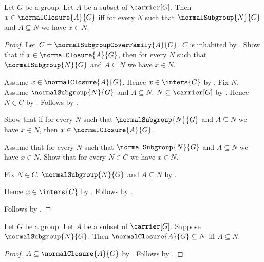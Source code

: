 \begin{theorem}\label{normal_closure_iff}
    Let $G$ be a group.
    Let $A$ be a subset of $\carrier[G]$.
    Then $x\in\normalClosure{A}{G}$ iff for every $N$ such that
        $\normalSubgroup{N}{G}$ and $A\subseteq N$ we have $x\in N$.
\end{theorem}
\begin{proof}
    Let $C=\normalSubgroupCoverFamily{A}{G}$.
    $C$ is inhabited by
        .
    Show that if $x\in\normalClosure{A}{G}$, then for every $N$ such that
        $\normalSubgroup{N}{G}$ and $A\subseteq N$ we have $x\in N$.
    \begin{subproof}
        Assume $x\in\normalClosure{A}{G}$.
        Hence $x\in\inters{C}$ by .
        Fix $N$.
        Assume $\normalSubgroup{N}{G}$ and $A\subseteq N$.
        $N\subseteq\carrier[G]$ by
            .
        Hence $N\in C$ by
            .
        Follows by .
    \end{subproof}
    Show that if for every $N$ such that
        $\normalSubgroup{N}{G}$ and $A\subseteq N$ we have $x\in N$, then
        $x\in\normalClosure{A}{G}$.
    \begin{subproof}
        Assume that for every $N$ such that
            $\normalSubgroup{N}{G}$ and $A\subseteq N$ we have $x\in N$.
        Show that for every $N\in C$ we have $x\in N$.
        \begin{subproof}
            Fix $N\in C$.
            $\normalSubgroup{N}{G}$ and $A\subseteq N$ by
                .
        \end{subproof}
        Hence $x\in\inters{C}$ by .
        Follows by .
    \end{subproof}
    Follows by \auto.
\end{proof}

\begin{theorem}\label{normal_closure_universal_property}
    Let $G$ be a group.
    Let $A$ be a subset of $\carrier[G]$.
    Suppose $\normalSubgroup{N}{G}$.
    Then $\normalClosure{A}{G}\subseteq N$ iff $A\subseteq N$.
\end{theorem}
\begin{proof}
    $A\subseteq\normalClosure{A}{G}$ by
        .
    Follows by .
\end{proof}


